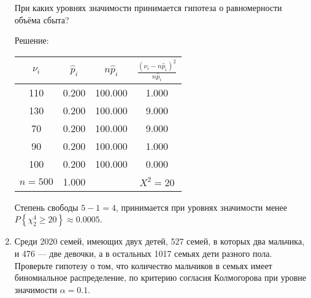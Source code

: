 \documentclass[a4paper,12pt]{article}
\newcommand{\probability}[1]{P \left\{ #1 \right\}}
\begin{document}
\begin{enumerate}
            При каких уровнях значимости принимается гипотеза о равномерности объёма сбыта?

            Решение: \par
            \begin{tabular}{|c|c|c|c|}
                  \hline
                  $\nu_i$   & $\widehat{p}_i$ & $n \widehat{p}_i$ & $\frac{(\nu_i - n \widehat{p}_i)^2}{n \widehat{p}_i}$ \\
                  \hline
                  110       & 0.200           & 100.000           & 1.000                                                 \\
                  130       & 0.200           & 100.000           & 9.000                                                 \\
                  70        & 0.200           & 100.000           & 9.000                                                 \\
                  90        & 0.200           & 100.000           & 1.000                                                 \\
                  100       & 0.200           & 100.000           & 0.000                                                 \\
                  \hline
                  $n = 500$ & 1.000           &                   & $X^2 = 20$                                            \\
                  \hline
            \end{tabular}

            Степень свободы $5 - 1 = 4$, принимается при уровнях значимости менее $\probability{\chi_2^4 \ge 20} \approx 0.0005$.

      \item \cite[3.17]{Ivchenko} Среди 2020 семей, имеющих двух детей, 527 семей, в которых два мальчика, и 476 --- две девочки, а в остальных
            1017 семьях дети разного пола. Проверьте гипотезу о том, что количество мальчиков в семьях имеет биномиальное распределение,
            по критерию согласия Колмогорова при уровне значимости $\alpha = 0.1$.


\end{enumerate}
\end{document}
